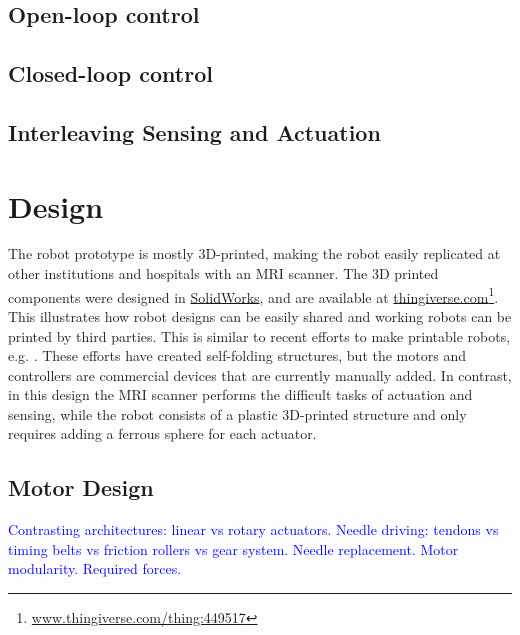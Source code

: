 \documentclass[letterpaper, 10 pt]{IEEEtran}
\newcommand{\todoRemy}[1]{\textcolor{blue}{#1}}
\begin{document}
\subsection{Open-loop control}\label{subsec:TheoryOpenLoop}

\subsection{Closed-loop control}\label{subsec:TheoryClosedLoop}

\subsection{Interleaving Sensing and Actuation}\label{subsec:InterleaveSenseActuate}



  
 
\section{Design}
 
 The robot prototype is mostly 3D-printed, making the robot easily replicated at other institutions and hospitals with an MRI scanner. The 3D printed components were designed in \href{http://www.solidworks.com/}{SolidWorks}, and are available at \href{http://www.thingiverse.com/thing:449517}{thingiverse.com}\footnote{\href{http://www.thingiverse.com/thing:449517}{www.thingiverse.com/thing:449517}}. This illustrates how robot designs can be easily shared and working robots can be printed by third parties.  This is similar to recent efforts to make printable robots, e.g. \cite{Felton08082014}.  These efforts have created self-folding structures, but the motors and controllers are commercial devices that are currently manually added.  In contrast, in this design the MRI scanner performs the difficult tasks of actuation and sensing, while the robot consists of a plastic 3D-printed structure and only requires adding a ferrous sphere for each actuator.

\subsection{Motor Design}
\todoRemy{Contrasting architectures: linear vs rotary actuators.  
Needle driving: tendons vs timing belts vs friction rollers vs gear system.  
Needle replacement.  
Motor modularity.
Required forces. }
\end{document}
